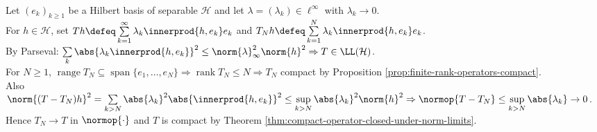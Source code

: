 \begin{example} \label{ex:diagonal-compact-operator-orthonormal-basis} \\
Let $(e_k)_{k\geq1}$ be a Hilbert basis of separable $\mathcal{H}$ and let $\lambda=(\lambda_k)\in\ell^\infty$ with $\lambda_k\to0$.\\
For $h\in\mathcal{H}$, set $Th\defeq\sum\limits_{k=1}^{\infty}\lambda_k\innerprod{h,e_k}e_k$ and $T_Nh\defeq\sum\limits_{k=1}^{N}\lambda_k\innerprod{h,e_k}e_k$.\\
By Parseval: $\sum\limits_k\abs{\lambda_k\innerprod{h,e_k}}^2\leq\norm{\lambda}_\infty^2\norm{h}^2\Rightarrow T\in\LL(\mathcal{H})$.\\
For $N\geq1$, $\operatorname{range}T_N\subseteq\operatorname{span}\{e_1,\ldots,e_N\}\Rightarrow\operatorname{rank}T_N\leq N\Rightarrow T_N$ compact by Proposition \ref{prop:finite-rank-operators-compact}.\\
Also $\norm{(T-T_N)h}^2=\sum\limits_{k>N}\abs{\lambda_k}^2\abs{\innerprod{h,e_k}}^2\leq\sup\limits_{k>N}\abs{\lambda_k}^2\norm{h}^2\Rightarrow\normop{T-T_N}\leq\sup\limits_{k>N}\abs{\lambda_k}\to0$.\\
Hence $T_N\to T$ in $\normop{\cdot}$ and $T$ is compact by Theorem \ref{thm:compact-operator-closed-under-norm-limits}.
\end{example}

